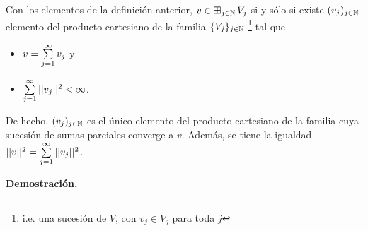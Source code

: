 \begin{prop} \label{prop: caracterizacion suma infinita de subespacios ortogonales} 
Con los elementos de la definición anterior,
$ v \in \operatorname*{{\boxplus}}_{j \in \mathbb{N}} V_{j} $
si y sólo si existe $(v_{j})_{j \in \mathbb{N}}$ 
elemento del producto cartesiano de la familia 
$\{ V_{j} \}_{j \in \mathbb{N}}$
\footnote{i.e. una sucesión
de $V$, con $v_{j} \in V_{j}$ para toda $j$}
tal que 
\begin{itemize}
\item $v = \sum\limits_{j=1}^{\infty}v_{j}$ y
\item $\sum\limits_{j=1}^{\infty}|| v_{j} ||^{2}< \infty $.
\end{itemize}
De hecho, $(v_{j})_{j \in \mathbb{N}}$ es el único elemento
del producto cartesiano de la familia cuya sucesión de
sumas parciales converge a $v$. Además, se tiene la igualdad
$|| v ||^{2}= \sum\limits_{j=1}^{\infty}|| v_{j} ||^{2} $.
\end{prop}
\noindent
\textbf{Demostración.}
